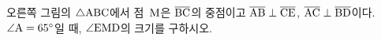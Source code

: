 \noindent\begin{minipage}[t]{0.58\linewidth}\vspace{0pt}\raggedright 오른쪽 그림의 $\triangle\mathrm{ABC}$에서 점~$\mathrm{M}$은 $\overline{\mathrm{BC}}$의 중점이고 $\overline{\mathrm{AB}}\perp\overline{\mathrm{CE}}$, $\overline{\mathrm{AC}}\perp\overline{\mathrm{BD}}$이다. $\angle\mathrm{A}=65^\circ$일 때, $\angle\mathrm{EMD}$의 크기를 구하시오.\end{minipage}\hfill\begin{minipage}[t]{0.4\linewidth}\vspace{0pt}\centering \resizebox{\ifdim\width>\linewidth\linewidth\else\width\fi}{!}{}\end{minipage}\par

